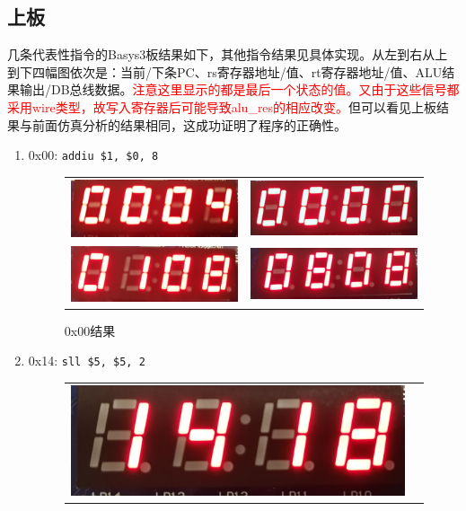 
\subsection{上板}
\qquad 几条代表性指令的Basys3板结果如下，其他指令结果见具体实现。从左到右从上到下四幅图依次是：当前/下条PC、rs寄存器地址/值、rt寄存器地址/值、ALU结果输出/DB总线数据。\textcolor{red}{注意这里显示的都是最后一个状态的值。又由于这些信号都采用wire类型，故写入寄存器后可能导致alu\_res的相应改变。}但可以看见上板结果与前面仿真分析的结果相同，这成功证明了程序的正确性。
\begin{enumerate}
    \item 0x00: \verb'addiu $1, $0, 8'
    \begin{figure}[H]
    \centering
    \begin{tabular}{cc}
    \includegraphics[width=0.3\linewidth]{fig/Implementation/0x00_00.jpg}&
    \includegraphics[width=0.3\linewidth]{fig/Implementation/0x00_01.jpg}\\
    \includegraphics[width=0.3\linewidth]{fig/Implementation/0x00_10.jpg}&
    \includegraphics[width=0.3\linewidth]{fig/Implementation/0x00_11.jpg}
    \end{tabular}
    \caption{0x00结果}
    \end{figure}
    \item 0x14: \verb'sll $5, $5, 2'
    \begin{figure}[H]
    \centering
    \begin{tabular}{cc}
    \includegraphics[width=0.3\linewidth]{fig/Implementation/0x14_00.jpg}&

\end{tabular}
\end{figure}
\end{enumerate}
